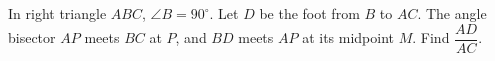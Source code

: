 In right triangle $ABC$, $\angle B=90^\circ$. Let $D$ be the foot from $B$ to $AC$. The angle bisector $AP$ meets $BC$ at $P$, and $BD$ meets $AP$ at its midpoint $M$. Find $\dfrac{AD}{AC}$.
